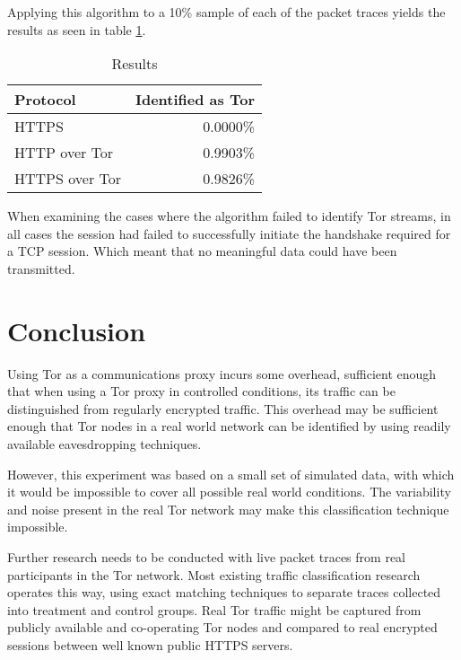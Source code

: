 \documentclass[conference]{IEEEtran}
\begin{document}
Applying this algorithm to a 10\% sample of each of the packet traces yields
the results as seen in table \ref{table:heuristic-results}.

\begin{table}[H]
  \begin{tabular*}{\linewidth}{lr}
    \toprule
    Protocol & Identified as Tor\\
    \midrule
    HTTPS & 0.0000\% \\
    HTTP over Tor & 0.9903\% \\
    HTTPS over Tor & 0.9826\% \\
    \bottomrule
  \end{tabular*}
  \caption{Results}
  \label{table:heuristic-results}
\end{table}

When examining the cases where the algorithm failed to identify Tor streams, in
all cases the session had failed to successfully initiate the handshake
required for a TCP session. Which meant that no meaningful data could have been
transmitted.



\section{Conclusion}

Using Tor as a communications proxy incurs some overhead, sufficient enough
that when using a Tor proxy in controlled conditions, its traffic can be
distinguished from regularly encrypted traffic. This overhead may be sufficient
enough that Tor nodes in a real world network can be identified by using
readily available eavesdropping techniques.

However, this experiment was based on a small set of simulated data, with which
it would be impossible to cover all possible real world conditions. The
variability and noise present in the real Tor network may make this
classification technique impossible.

Further research needs to be conducted with live packet traces from real
participants in the Tor network. Most existing traffic classification research
operates this way, using exact matching techniques to separate traces collected
into treatment and control groups. Real Tor traffic might be captured from
publicly available and co-operating Tor nodes and compared to real encrypted
sessions between well known public HTTPS servers.

\printbibliography
\end{document}
